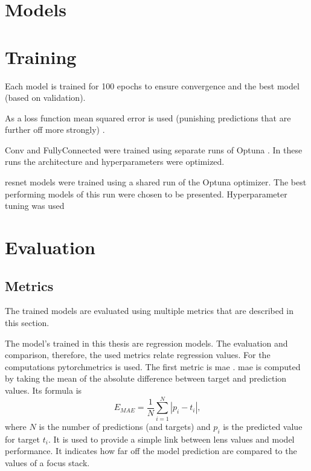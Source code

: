 \section{Models}
\label{sec:Methods:Models}


\section{Training}
\label{sec:Methods:Training}

Each model is trained for 100 epochs to ensure convergence and the best model (based on validation).

As a loss function mean squared error is used (punishing predictions that are further off more strongly) .

Conv and FullyConnected were trained using separate runs of Optuna . In these runs the architecture and hyperparameters were optimized.

\Ac{resnet} models were trained using a shared run of the Optuna  optimizer. The best performing models of this run were chosen to be presented. Hyperparameter tuning was used

\section{Evaluation}
\label{sec:Methods:Evaluation}

\subsection{Metrics}
\label{sec:Methods:Evaluation:Metrics}

The trained models are evaluated using multiple metrics that are described in this section.

The model's trained in this thesis are regression models. The evaluation and comparison, therefore, the used metrics relate regression values. For the computations pytorchmetrics  is used. The first metric is \ac{mae} . \Ac{mae} is computed by taking the mean of the absolute difference between target and prediction values. Its formula is $$E_{MAE} = \frac{1}{N}\sum_{i=1}^N |p_i - t_i| \text{,}$$ where $N$ is the number of predictions (and targets) and $p_i$ is the predicted value for target $t_i$.
It is used to provide a simple link between lens values and model performance. It indicates how far off the model prediction are compared to the values of a focus stack.

